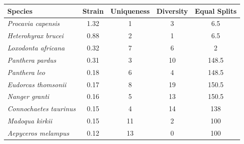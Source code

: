 \documentclass[12pt]{article}
\begin{document}
\begin{tabular}{|l|*{4}{c|}}
\hline
Species	&Strain	&Uniqueness	&Diversity &Equal Splits\\
\hline
\emph{Procavia capensis}	&1.32	&1	&3	&6.5\\
\emph{Heterohyrax brucei}	&0.88	&2	&1	&6.5\\
\emph{Loxodonta africana}	&0.32	&7	&6	&2\\
\emph{Panthera pardus}		&0.31	&3	&10	&148.5\\
\emph{Panthera leo}		&0.18	&6	&4	&148.5\\
\emph{Eudorcas thomsonii}	&0.17	&8	&19	&150.5\\
\emph{Nanger granti}		&0.16	&5	&13	&150.5\\
\emph{Connochaetes taurinus}	&0.15	&4	&14	&138\\
\emph{Madoqua kirkii}		&0.15	&11	&2	&100\\
\emph{Aepyceros melampus}	&0.12	&13	&0	&100\\
\hline
\end{tabular}
\end{document}
